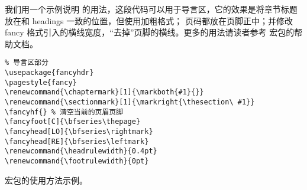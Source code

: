 我们用一个示例说明  的用法，这段代码可以用于导言区，它的效果是将章节标题放在和 headings 一致的位置，但使用加粗格式；
页码都放在页脚正中；并修改 fancy 格式引入的横线宽度，“去掉”页脚的横线。更多的用法请读者参考  宏包的帮助文档。

\begin{sourcecode}[hbp]
\begin{Verbatim}
% 导言区部分
\usepackage{fancyhdr}
\pagestyle{fancy}
\renewcommand{\chaptermark}[1]{\markboth{#1}{}}
\renewcommand{\sectionmark}[1]{\markright{\thesection\ #1}}
\fancyhf{} % 清空当前的页眉页脚
\fancyfoot[C]{\bfseries\thepage}
\fancyhead[LO]{\bfseries\rightmark}
\fancyhead[RE]{\bfseries\leftmark}
\renewcommand{\headrulewidth}{0.4pt}
\renewcommand{\footrulewidth}{0pt}
\end{Verbatim}
\caption{ 宏包的使用方法示例。}
\end{sourcecode}

\endinput
